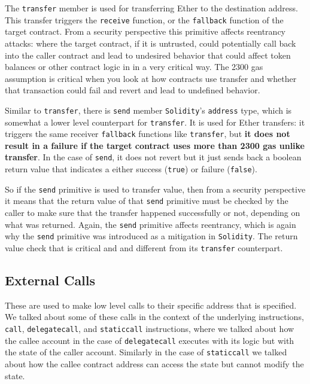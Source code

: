 The \texttt{transfer} member is used for transferring Ether to the
destination address. This transfer triggers the \texttt{receive}
function, or the \texttt{fallback} function of the target contract. From
a security perspective this primitive affects reentrancy attacks: where
the target contract, if it is untrusted, could potentially call back
into the caller contract and lead to undesired behavior that could
affect token balances or other contract logic in in a very critical way.
The 2300 gas assumption is critical when you look at how contracts use
transfer and whether that transaction could fail and revert and lead to
undefined behavior.

Similar to \texttt{transfer}, there is \texttt{send} member
\texttt{Solidity}'s \texttt{address} type, which is somewhat a lower
level counterpart for \texttt{transfer}. It is used for Ether transfers:
it triggers the same receiver \texttt{fallback} functions like
\texttt{transfer}, but \textbf{it does not result in a failure if the
target contract uses more than 2300 gas unlike transfer}. In the case of
\texttt{send}, it does not revert but it just sends back a boolean
return value that indicates a either success (\texttt{true}) or failure
(\texttt{false}).

So if the \texttt{send} primitive is used to transfer value, then from a
security perspective it means that the return value of that
\texttt{send} primitive must be checked by the caller to make sure that
the transfer happened successfully or not, depending on what was
returned. Again, the \texttt{send} primitive affects reentrancy, which
is again why the \texttt{send} primitive was introduced as a mitigation
in \texttt{Solidity}. The return value check that is critical and and
different from its \texttt{transfer} counterpart.

\subsection{External Calls}\label{external-calls}

These are used to make low level calls to their specific address that is
specified. We talked about some of these calls in the context of the
underlying instructions, \texttt{call}, \texttt{delegatecall}, and
\texttt{staticcall} instructions, where we talked about how the callee
account in the case of \texttt{delegatecall} executes with its logic but
with the state of the caller account. Similarly in the case of
\texttt{staticcall} we talked about how the callee contract address can
access the state but cannot modify the state.

